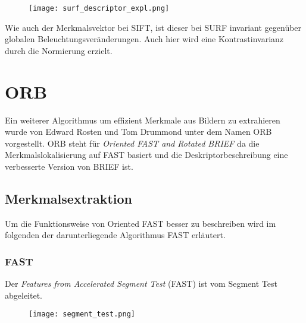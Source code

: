 \begin{figure}[h]
\texttt{[image: surf\_descriptor\_expl.png]}
\centering
\end{figure}

Wie auch der Merkmalsvektor bei SIFT, ist dieser bei SURF invariant gegenüber globalen Beleuchtungsveränderungen. Auch hier wird eine Kontrastinvarianz durch die Normierung erzielt.

\section{ORB}

Ein weiterer Algorithmus um effizient Merkmale aus Bildern zu extrahieren wurde von Edward Rosten und Tom Drummond unter dem Namen ORB vorgestellt.
ORB steht für \emph{Oriented FAST and Rotated BRIEF} da die Merkmalslokalisierung auf FAST basiert und die Deskriptorbeschreibung eine verbesserte Version von BRIEF ist.

\subsection{Merkmalsextraktion}
Um die Funktionsweise von Oriented FAST besser zu beschreiben wird im folgenden der darunterliegende Algorithmus FAST erläutert.
\subsubsection{FAST}

Der \emph{Features from Accelerated Segment Test} (FAST) ist vom Segment Test abgeleitet.

\begin{figure}[h]
\texttt{[image: segment\_test.png]}
\centering
\end{figure}

